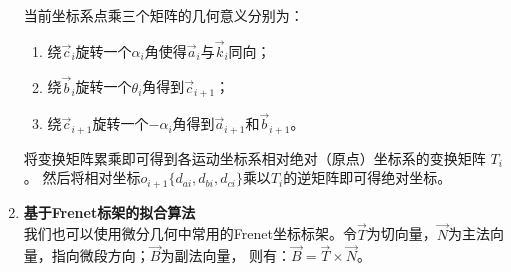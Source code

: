 \begin{enumerate}[label=(\Alph*)]
    当前坐标系点乘三个矩阵的几何意义分别为：\\
    \begin{enumerate}
        \item 绕$\vec c_i$旋转一个$\alpha_i$角使得$\vec a_i$与$\vec k_i$同向；
        \item 绕$\vec b_i$旋转一个$\theta_i$角得到$\vec c_{i+1}$；
        \item 绕$\vec c_{i+1}$旋转一个$-\alpha_i$角得到$\vec a_{i+1}$和$\vec b_{i+1}$。
    \end{enumerate}

    将变换矩阵累乘即可得到各运动坐标系相对绝对（原点）坐标系的变换矩阵 $T_i$。
    然后将相对坐标$o_{i+1} \{d_{ai}, d_{bi}, d_{ci}\}$乘以$T_i$的逆矩阵即可得绝对坐标。

    \item \textbf{基于Frenet标架的拟合算法} \\
    我们也可以使用微分几何中常用的Frenet坐标标架。令$\vec T$为切向量，$\vec N$为主法向量，指向微段方向；$\vec B$为副法向量，
    则有：$\vec B = \vec T \times \vec N$。


\end{enumerate}
